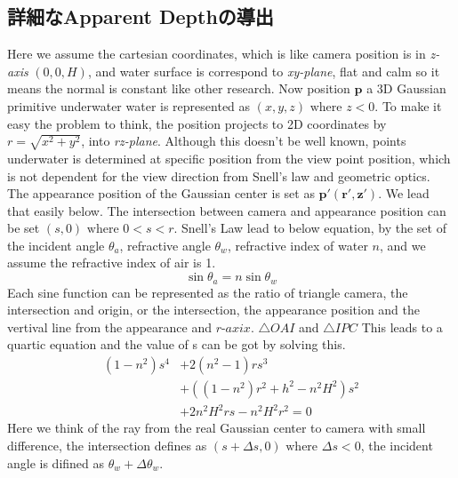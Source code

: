 \subsection{詳細なApparent Depthの導出}

Here we assume the cartesian coordinates, which is like camera position is in \textit{z-axis} $(0, 0, H)$, and water surface is correspond to \textit{xy-plane}, flat and calm so it means the normal is constant like other research. %
Now position $\bm{p}$ a 3D Gaussian primitive underwater water is represented as $(x, y, z) \text{ where } z < 0$.
To make it easy the problem to think, the position projects to 2D coordinates by $r = \sqrt{x^2 + y^2}$, into \textit{rz-plane}. %
Although this doesn't be well known, points underwater is determined at specific position from the view point position, which is not dependent for the view direction from Snell's law and geometric optics.
The appearance position of the Gaussian center is set as $\bm{p' (r', z')}$.
We lead that easily below.
The intersection between camera and appearance position can be set $(s, 0) \text{ where } 0 <  s < r $.
Snell's Law lead to below equation, by the set of the incident angle $\theta_a$, refractive angle $\theta_w$, refractive index of water $n$, and we assume the refractive index of air is 1. %
\begin{equation}\label{eq:snell}
  \sin \theta_a = n \sin \theta_w
\end{equation}
Each sine function can be represented as the ratio of triangle camera, the intersection and origin, or the intersection, the appearance position and the vertival line from the appearance and $\textit{r-axix}$.
$\triangle OAI$ and $\triangle IPC$
This leads to a quartic equation and the value of s can be got by solving this. %
\begin{equation}\label{eq:quartic-s}
\begin{split}
  (1-n^2)s^4 &+ 2(n^2-1)rs^3 \\
             &+ ((1-n^2)r^2 + h^2 - n^2 H^2)s^2 \\
             &+ 2n^2H^2rs - n^2H^2r^2 = 0 %
\end{split}
\end{equation}
Here we think of the ray from the real Gaussian center to camera with small difference, the intersection defines as $(s + \Delta s, 0) \text{ where }  \Delta s < 0$, the incident angle is difined as $\theta_w + \Delta \theta_w$.
